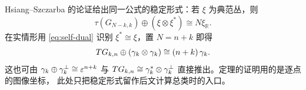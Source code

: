 \begin{remark}
Hsiang--Szczarba \cite{HsiangSzczarba1964} 的论证给出同一公式的稳定形式：若
$\xi$ 为典范丛，则
\[
  \tau(G_{N-k,k})\oplus(\xi\otimes\xi^{*})\cong N\xi_{\mathbb{R}} .
\]
在实情形用 \eqref{eq:self-dual} 识别 $\xi^{*}\cong\xi$，置 $N=n+k$ 即得
\begin{equation}
  TG_{k,n}\oplus(\gamma_k\otimes\gamma_k)\cong(n+k)\,\gamma_k .
  \label{eq:stable-tangent}
\end{equation}
这也可由 $\gamma_k\oplus\gamma^{\perp}_k\cong\varepsilon^{n+k}$ 与
$TG_{k,n}\cong\gamma_k^{*}\otimes\gamma^{\perp}_k$ 直接推出。定理的证明用的是逐点的图像坐标，
此处只把稳定形式留作后文计算总类时的入口。
\end{remark}
